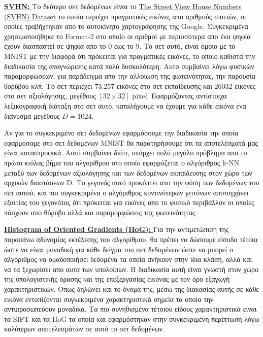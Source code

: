 \par
\href{http://ufldl.stanford.edu/housenumbers/}{\textbf{\textlatin{SVHN: }}}Το δεύτερο σετ δεδομένων είναι το \href{http://ufldl.stanford.edu/housenumbers/}{\textlatin{The Street View House Numbers (SVHN) Dataset}} το οποίο περιέχει πραγματικές εικόνες απο αριθμούς σπιτιών, οι οποίες τραβήχτηκαν απο το αυτοκίνητο χαρτογράφησης της \textlatin{Google}. Συγκεκριμένα χρησιμοποιήθηκε το \textlatin{Format-2} στο οποίο οι αριθμοί με περισσότερα απο ένα ψηφία έχουν διασπαστεί σε ψηφία απο το 0 εως το 9. Το σετ αυτό, είναι όμοιο με το \textlatin{MNIST} με την διαφορά ότι πρόκειται για πραγματικές εικόνες, το οποίο καθιστά την διαδικασία της αναγνώρισης κατά πολύ δυσκολότερη. Αυτο συμβαίνει λόγω φυσικών παραμορφώσεων, για παράδειγμα απο την αλλοίωση της φωτεινότητας, την παρουσία θορύβου κλπ. Το σετ περιέχει 73.257 εικόνες στο σετ εκπαίδευσης και 26032 εικόνες στο σετ αξιολόγησης, μεγέθους $[32 \times 32]$ \textlatin{pixel}. Εφαρμόζοντας αντίστοιχα λεξικογραφική διάταξη στο σετ αυτό, καταλήγουμε να έχουμε για κάθε εικόνα ένα διάνυσμα μεγέθους $D = 1024$. 
\par
Αν για το συγκεκριμένο σετ δεδομένων εφαρμόσουμε την διαδικασία την οποία εφαρμόσαμε στο σετ δεδομένων \textlatin{MNIST} θα παρατηρήσουμε ότι τα αποτελέσματά μας είναι καταστροφικά. Αυτό συμβαίνει διότι, υπάρχει πολύ μεγάλο πρόβλημα απο το πρώτο κιόλας βήμα του αλγορίθμου στο οποίο εφαρμόζεται ο αλγόριθμος \textlatin{k-NN} μεταξύ των δεδομένων αξιολόγησης και των δεδομένων εκπαίδευσης στον χώρο των αρχικών διαστάσεων \textlatin{D}. Το γεγονός αυτό προκύπτει απο την φύση των δεδομένων του σετ αυτού, και πιο συγκεκριμένα ο αλγόριθμος κοντινότερων γειτόνων αποτυγχάνει εξαιτίας του γεγονότος ότι πρόκειται για εικόνες απο το φυσικό περιβάλλον οι οποίες πάσχουν απο θόρυβο αλλά και παραμορφώσεις της φωτεινότητας. 
\par
\href{https://en.wikipedia.org/wiki/Histogram_of_oriented_gradients}{\textbf{\textlatin{Histogram of Oriented Gradients (HoG): }}} Για την αντιμετώπιση της παραπάνω αδυναμίας εκτέλεσης του αλγορίθμου, θα πρέπει να δώσουμε είσοδο τέτοια ώστε να είναι μοναδική για κάθε δείγμα του σετ δεδομένων ώστε να μπορεί ο αλγόριθμος να ομαδοποιήσει δεδομένα τα οποία ανήκουν στην ίδια κλάση, αλλά και να τα ξεχωρίσει απο αυτά των υπολοίπων. Η διαδικασία αυτή είναι γνωστή στον χώρο της υπολογιστικής όρασης και της επεξεργασίας εικόνας με τον όρο εξαγωγή χαρακτηριστικών. Όπως δηλώνει και το όνομά της, μέσω της διακασίας αυτής σε κάθε εικόνα εντοπίζονται συγκεκριμένα χαρακτηριστικά σημεία τα οποία την αντιπροσωπεύουν μοναδικά. Τα πιο συνηθισμένα τέτοιου είδους χαρακτηριστικά είναι τα \textlatin{SIFT} και τα \textlatin{HoG} τα οποία και εφαρμόστηκαν στην συγκεκριμένη περίπτωση λόγω καλύτερων αποτελεσμάτων σε αυτό το σετ δεδομένων. 
